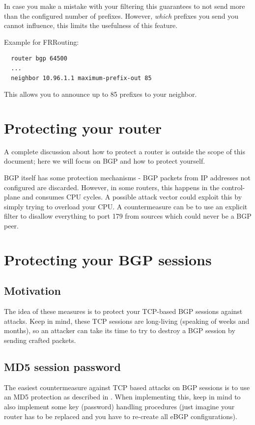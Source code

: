 In case you make a mistake with your filtering this guarantees to not send more than the configured number of prefixes. However, \emph{which} prefixes you send you cannot influence, this limits the usefulness of this feature.

Example for FRRouting:
\begin{verbatim}
  router bgp 64500
  ...
  neighbor 10.96.1.1 maximum-prefix-out 85
\end{verbatim}
This allows you to announce up to 85 prefixes to your neighbor.

\section{Protecting your router}
A complete discussion about how to protect a router is outside the scope of this document; here we will focus on BGP and how to protect yourself.

BGP itself has some protection mechanisms - BGP packets from IP addresses not configured are discarded. However, in some routers, this happens in the control-plane and consumes CPU cycles. A possible attack vector could exploit this by simply trying to overload your CPU. A countermeasure can be to use an explicit filter to disallow everything to port 179 from sources which could never be a BGP peer.

\section{Protecting your BGP sessions}
\subsection{Motivation}
The idea of these measures is to protect your TCP-based BGP sessions against attacks. Keep in mind, these TCP sessions are long-living (speaking of weeks and months), so an attacker can take its time to try to destroy a BGP session by sending crafted packets.

\subsection{MD5 session password}

The easiest countermeasure against TCP based attacks on BGP sessions is to use an \gls{MD5} protection as described in . When implementing this, keep in mind to also implement some key (password) handling procedures (just imagine your router has to be replaced and you have to re-create all eBGP configurations).

